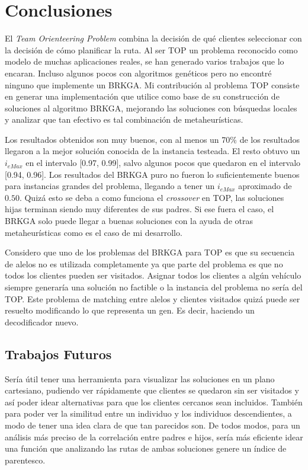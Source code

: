 \chapter{Conclusiones}

\bigskip

El \textit{Team Orienteering Problem} combina la decisión de qué clientes seleccionar con la decisión de cómo planificar la ruta. Al ser TOP un problema reconocido como modelo de muchas aplicaciones reales, se han generado varios trabajos que lo encaran. Incluso algunos pocos con algoritmos genéticos pero no encontré ninguno que implemente un BRKGA. Mi contribución al problema TOP consiste en generar una implementación que utilice como base de su construcción de soluciones al algoritmo BRKGA, mejorando las soluciones con búsquedas locales y analizar que tan efectivo es tal combinación de metaheurísticas.

\bigskip

Los resultados obtenidos son muy buenos, con al menos un 70\% de los resultados llegaron a la mejor solución conocida de la instancia testeada. El resto obtuvo un $i_{eMax}$ en el intervalo [0.97, 0.99], salvo algunos pocos que quedaron en el intervalo [0.94, 0.96]. Los resultados del BRKGA puro no fueron lo suficientemente buenos para instancias grandes del problema, llegando a tener un $i_{eMax}$ aproximado de $0.50$. Quizá esto se deba a como funciona el \textit{crossover} en TOP, las soluciones hijas terminan siendo muy diferentes de sus padres. Si ese fuera el caso, el BRKGA solo puede llegar a buenas soluciones con la ayuda de otras metaheurísticas como es el caso de mi desarrollo.

\bigskip

Considero que uno de los problemas del BRKGA para TOP es que su secuencia de alelos no es utilizada completamente ya que parte del problema es que no todos los clientes pueden ser visitados. Asignar todos los clientes a algún vehículo siempre generaría una solución no factible o la instancia del problema no sería del TOP. Este problema de matching entre alelos y clientes visitados quizá puede ser resuelto modificando lo que representa un gen. Es decir, haciendo un decodificador nuevo.

\section{Trabajos Futuros}

Sería útil tener una herramienta para visualizar las soluciones en un plano cartesiano, pudiendo ver rápidamente que clientes se quedaron sin ser visitados y así poder idear alternativas para que los clientes cercanos sean incluidos. También para poder ver la similitud entre un individuo y los individuos descendientes, a modo de tener una idea clara de que tan parecidos son. De todos modos, para un análisis más preciso de la correlación entre padres e hijos, sería más eficiente idear una función que analizando las rutas de ambas soluciones genere un índice de parentesco.

